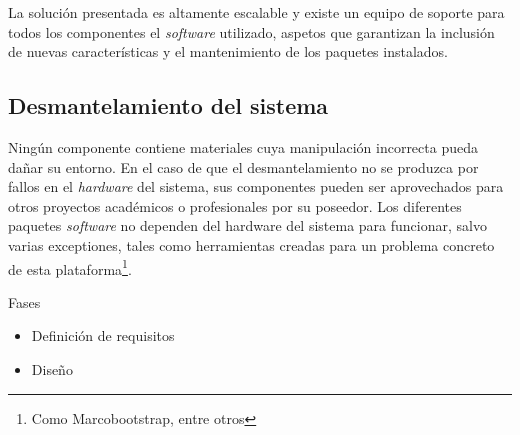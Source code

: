 La solución presentada es altamente escalable y existe un equipo de soporte para todos los componentes el \textit{software} utilizado, aspetos que garantizan la inclusión de nuevas características y el mantenimiento de los paquetes instalados.  

\subsection{Desmantelamiento del sistema}

Ningún componente contiene materiales cuya manipulación incorrecta pueda dañar su entorno. En el caso de que el desmantelamiento no se produzca por fallos en el \textit{hardware} del sistema, sus componentes pueden ser aprovechados para otros proyectos académicos o profesionales por su poseedor. Los diferentes paquetes \textit{software} no dependen del hardware del sistema para funcionar, salvo varias exceptiones, tales como herramientas creadas para un problema concreto de esta plataforma\footnote{Como Marcobootstrap, entre otros}.

Fases
\begin{itemize}
  \item Definición de requisitos
  \item Diseño
\end{itemize}




